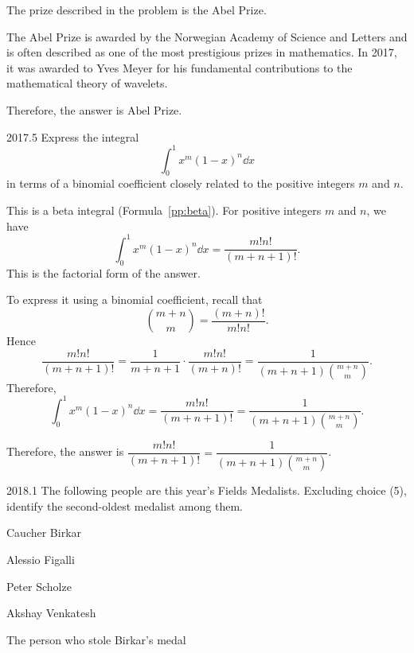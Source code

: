     \begin{solution}
        The prize described in the problem is the Abel Prize.

        The Abel Prize is awarded by the Norwegian Academy of Science and Letters and is often
        described as one of the most prestigious prizes in mathematics. In 2017, it was awarded to
        Yves Meyer for his fundamental contributions to the mathematical theory of wavelets.

        Therefore, the answer is $\boxed{\text{Abel Prize}}$.
    \end{solution}

    \begin{pastproblem}{2017.5}
        Express the integral
        \[
            \int_0^1 x^m(1-x)^n\dd x
        \]
        in terms of a binomial coefficient closely related to the positive integers $m$ and $n$.
    \end{pastproblem}

    \begin{solution}
        This is a beta integral (Formula~\ref{pp:beta}). For positive integers $m$ and $n$, we have
        \[
            \int_0^1 x^m(1-x)^n\dd x
            =
            \frac{m!n!}{(m+n+1)!}.
        \]
        This is the factorial form of the answer.

        To express it using a binomial coefficient, recall that
        \[
            \binom{m+n}{m}
            =
            \frac{(m+n)!}{m!n!}.
        \]
        Hence
        \[
            \frac{m!n!}{(m+n+1)!}
            =
            \frac{1}{m+n+1}\cdot\frac{m!n!}{(m+n)!}
            =
            \frac{1}{(m+n+1)\binom{m+n}{m}}.
        \]
        Therefore,
        \[
            \int_0^1 x^m(1-x)^n\dd x
            =
            \frac{m!n!}{(m+n+1)!}
            =
            \frac{1}{(m+n+1)\binom{m+n}{m}}.
        \]

        Therefore, the answer is $\boxed{\dfrac{m!n!}{(m+n+1)!}
        =
        \dfrac{1}{(m+n+1)\binom{m+n}{m}}}$.
    \end{solution}

    \begin{pastproblem}{2018.1}
        The following people are this year's Fields Medalists. Excluding choice (5), identify the
        second-oldest medalist among them.
        \begin{problemchoices}
            \item Caucher Birkar
            \item Alessio Figalli
            \item Peter Scholze
            \item Akshay Venkatesh
            \item The person who stole Birkar's medal
        \end{problemchoices}
    \end{pastproblem}

